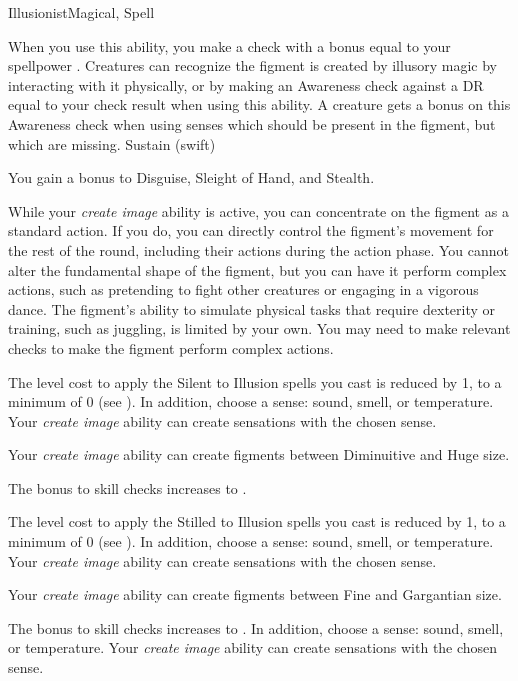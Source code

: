 \begin{feat}{Illusionist}{Magical, Spell}
\begin{ability}
\begin{spelleffects}
                When you use this ability, you make a check with a bonus equal to your spellpower .
                Creatures can recognize the figment is created by illusory magic by interacting with it physically, or by making an Awareness check against a DR equal to your check result when using this ability.
                A creature gets a  bonus on this Awareness check when using senses which should be present in the figment, but which are missing.
                \spelldur Sustain (swift)
            \end{spelleffects}
        \end{ability}

         You gain a  bonus to Disguise, Sleight of Hand, and Stealth.

         While your \textit{create image} ability is active, you can concentrate on the figment as a standard action.
        If you do, you can directly control the figment's movement for the rest of the round, including their actions during the action phase.
        You cannot alter the fundamental shape of the figment, but you can have it perform complex actions, such as pretending to fight other creatures or engaging in a vigorous dance.
        The figment's ability to simulate physical tasks that require dexterity or training, such as juggling, is limited by your own.
        You may need to make relevant checks to make the figment perform complex actions.

         The level cost to apply the Silent  to Illusion spells you cast is reduced by 1, to a minimum of 0 (see ).
        In addition, choose a sense: sound, smell, or temperature.
        Your \textit{create image} ability can create sensations with the chosen sense.

         Your \textit{create image} ability can create figments between Diminuitive and Huge size.

         The bonus to skill checks increases to .

         The level cost to apply the Stilled  to Illusion spells you cast is reduced by 1, to a minimum of 0 (see ).
        In addition, choose a sense: sound, smell, or temperature.
        Your \textit{create image} ability can create sensations with the chosen sense.

         Your \textit{create image} ability can create figments between Fine and Gargantian size.

         The bonus to skill checks increases to .
        In addition, choose a sense: sound, smell, or temperature.
        Your \textit{create image} ability can create sensations with the chosen sense.
    \end{feat}

